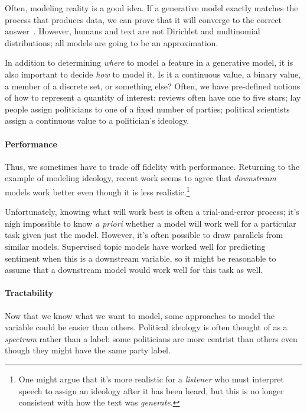 Often, modeling reality is a good idea.  If a generative model exactly
matches the process that produces data, we can prove that it will
converge to the correct answer~\cite{}.  However, humans and text are
not Dirichlet and multinomial distributions; all models are going to
be an approximation.

In addition to determining \emph{where} to model a feature in a
generative model, it is also important to decide \emph{how} to model
it.  Is it a continuous value, a binary value, a member of a discrete
set, or something else?  Often, we have pre-defined notions of how to
represent a quantity of interest: reviews often have one to five
stars; lay people assign politicians to one of a fixed number of
parties; political scientists assign a continuous value to a
politician's ideology.



\paragraph{Performance}

Thus, we sometimes have to trade off fidelity with performance.
Returning to the example of modeling ideology, recent work seems to
agree that \emph{downstream} models work better even though it is
less realistic.\footnote{One might argue that it's more realistic for
  a \emph{listener} who must interpret speech to assign an ideology
  after it has been heard, but this is no longer consistent with how
  the text was \emph{generate}.}

Unfortunately, knowing what will work best is often a trial-and-error
process; it's nigh impossible to know \textit{a priori} whether a
model will work well for a particular task given just the model.
However, it's often possible to draw parallels from similar models.
Supervised topic models have worked well for predicting sentiment when
this is a downstream variable, so it might be reasonable to assume
that a downstream model would work well for this task as well.

\paragraph{Tractability}

Now that we know what we want to model, some approaches to model the
variable could be easier than others.  Political ideology is often
thought of as a \emph{spectrum} rather than a label: some politicians
are more centrist than others even though they might have the same
party label.


